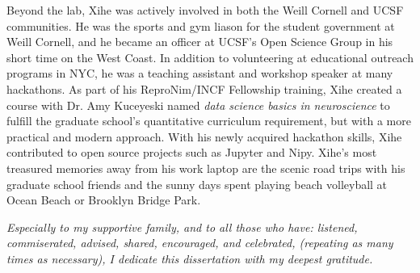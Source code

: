 \documentclass[phd,tocprelim]{cornell}
\begin{document}
\begin{biosketch}
Beyond the lab, Xihe was actively involved in both the Weill Cornell and UCSF communities. He was the sports and gym liason for the student government at Weill Cornell, and he became an officer at UCSF's Open Science Group in his short time on the West Coast. In addition to volunteering at educational outreach programs in NYC, he was a teaching assistant and workshop speaker at many hackathons. As part of his ReproNim/INCF Fellowship training, Xihe created a course with Dr. Amy Kuceyeski named \emph{data science basics in neuroscience} to fulfill the graduate school's quantitative curriculum requirement, but with a more practical and modern approach. With his newly acquired hackathon skills, Xihe contributed to open source projects such as Jupyter and Nipy. Xihe's most treasured memories away from his work laptop are the scenic road trips with his graduate school friends and the sunny days spent playing beach volleyball at Ocean Beach or Brooklyn Bridge Park.
\end{biosketch}

\begin{dedication}
\emph{Especially to my supportive family, and to all those who have: listened, commiserated, advised, shared, encouraged, and celebrated, (repeating as many times as necessary), I dedicate this dissertation with my deepest gratitude.}
\end{dedication}
\end{document}

